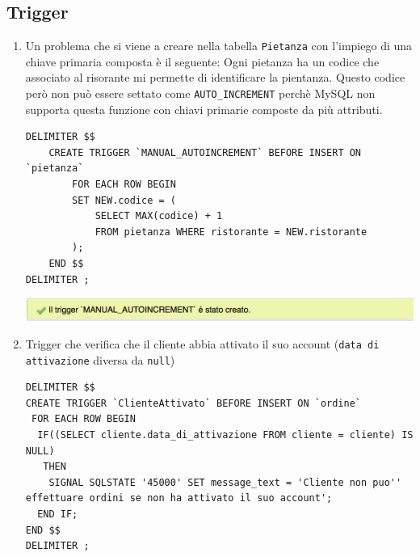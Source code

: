 \documentclass[10pt]{article}
\begin{document}
		\subsection{Trigger}
		\begin{enumerate}[noitemsep]
		\item Un problema che si viene a creare nella tabella \texttt{Pietanza} con l'impiego di una chiave primaria composta \`e il seguente: Ogni pietanza ha un codice che associato al risorante mi permette di identificare la pientanza. Questo codice per\`o non pu\`o essere settato come \texttt{AUTO\_INCREMENT} perch\`e MySQL non supporta questa funzione con chiavi primarie composte da pi\`u attributi.
		\begin{lstlisting}[style=Mysql]
DELIMITER $$		
	CREATE TRIGGER `MANUAL_AUTOINCREMENT` BEFORE INSERT ON `pietanza`
		FOR EACH ROW BEGIN
		SET NEW.codice = (
			SELECT MAX(codice) + 1
			FROM pietanza WHERE ristorante = NEW.ristorante
		);
	END $$		
DELIMITER ;
\end{lstlisting}
\begin{center}
\hspace*{-1cm}
\includegraphics[scale=0.9]{trigger1.png}
\hspace*{-1cm}
\end{center}
	\item Trigger che verifica che il cliente abbia attivato il suo account (\texttt{data di attivazione} diversa da \texttt{null})
	\begin{lstlisting}[style=Mysql]
DELIMITER $$
CREATE TRIGGER `ClienteAttivato` BEFORE INSERT ON `ordine`
 FOR EACH ROW BEGIN
  IF((SELECT cliente.data_di_attivazione FROM cliente = cliente) IS NULL)
   THEN 
	SIGNAL SQLSTATE '45000' SET message_text = 'Cliente non puo''  effettuare ordini se non ha attivato il suo account';
  END IF;
END $$
DELIMITER ;	\end{lstlisting}
	\end{enumerate}
\end{document}
